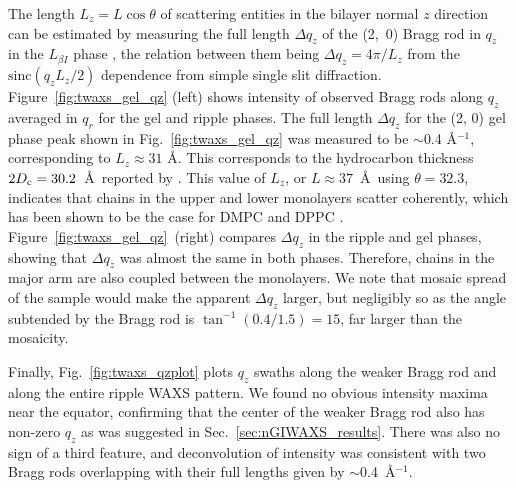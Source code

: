 The length $L_z=L\cos\theta$ of scattering entities in the bilayer normal $z$ direction can be estimated by 
measuring the full length $\Delta q_z$ of the (2,~0) Bragg rod in $q_z$ in
the $L_{\beta I}$ phase \cite{ref:Tristram93},
the relation between them being $\Delta q_z = 4\pi/L_z$ 
from the $\textrm{sinc}(q_zL_z/2)$ dependence from simple single slit 
diffraction. 
Figure~\ref{fig:twaxs_gel_qz} (left) shows intensity of observed Bragg rods along $q_z$ averaged in $q_r$
for the gel and ripple phases. The full length $\Delta q_z$ for the (2, 0) gel
phase peak shown in Fig.~\ref{fig:twaxs_gel_qz} was measured to be 
$\sim$0.4 \AA$^{-1}$, corresponding to 
$L_z \approx 31$ \AA. 
This corresponds to the hydrocarbon thickness $2D_\text{c}=30.2$~\AA\  
reported by \cite{Tristram-Nagle02}. 
This value of $L_z$, or $L\approx 37$~\AA\ using $\theta=32.3$\textdegree,
indicates that chains in the upper and
lower monolayers scatter coherently, which has been shown to be the case
for DMPC \cite{ref:Smith88} and DPPC \cite{ref:Tristram93}.
Figure~\ref{fig:twaxs_gel_qz}~(right) compares $\Delta q_z$ in the ripple and gel phases,
showing that $\Delta q_z$ was almost the same in both phases. Therefore, 
chains in the major arm are also coupled between the monolayers. 
We note that mosaic spread of the sample would make the apparent $\Delta q_z$ 
larger, but negligibly so as the angle subtended by the Bragg rod is $\tan^{-1}(0.4/1.5)=15$\textdegree, 
far larger than the mosaicity.

Finally, Fig.~\ref{fig:twaxs_qzplot} plots $q_z$ swaths along the weaker 
Bragg rod and along the entire ripple WAXS pattern. 
We found no obvious intensity maxima
near the equator, confirming that the center of the weaker Bragg rod also 
has non-zero $q_z$ as was suggested in Sec.~\ref{sec:nGIWAXS_results}.
There was also no sign of a third feature, and deconvolution of intensity
was consistent with two Bragg rods overlapping 
with their full lengths given by $\sim$0.4~\AA$^{-1}$.

